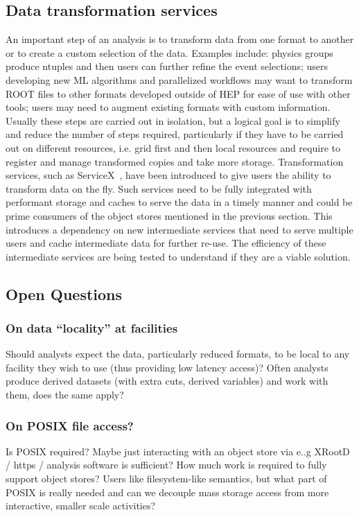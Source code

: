 \subsection*{Data transformation services}


An important step of an analysis is to transform data from one format to another or to create a custom selection of the data. Examples include: physics groups produce ntuples and then users can further refine the event selections; users developing new ML algorithms and parallelized workflows may want to transform ROOT files to other formats developed outside of HEP for ease of use with other tools; users may need to augment existing formats with custom information. Usually these steps are carried out in isolation, but a logical goal is to simplify and reduce the number of steps required, particularly if they have to be carried out on different resources, i.e. grid first and then local resources and require to register and manage transformed copies and take more storage.  Transformation services, such as ServiceX~\cite{servicex}, have been introduced to give users the ability to transform data on the fly. Such services need to be fully integrated with performant storage and caches to serve the data in a timely manner and could be prime consumers of the object stores mentioned in the previous section. This introduces a dependency on new intermediate services that need to serve multiple users and cache intermediate data for further re-use. The efficiency of these intermediate services are being tested to understand if they are a viable solution. 

\subsection*{Open Questions}

\subsubsection*{On data “locality” at facilities}

Should analysts expect the data, particularly reduced formats, to be local to any facility they wish to use (thus providing low latency access)? Often analysts produce derived datasets (with extra cuts, derived variables) and work with them, does the same apply? 

\subsubsection*{On POSIX file access?}
Is POSIX required? Maybe just interacting with an object store via e..g XRootD / https / analysis software is sufficient? How much work is required to fully support object stores? Users like filesystem-like semantics, but what part of POSIX is really needed and can we decouple mass storage access from more interactive, smaller scale activities?


